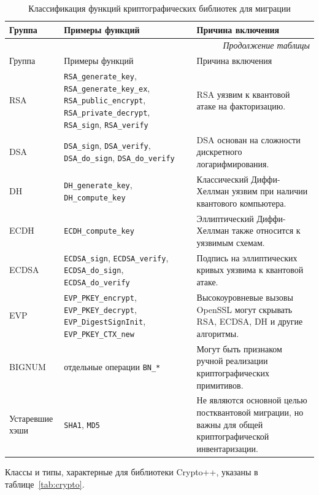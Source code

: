 \documentclass{itmo-vkr}
\begin{document}
\begin{longtable}{|l|p{5.0cm}|p{6.5cm}|}
	\caption{Классификация функций криптографических библиотек для миграции} \label{tab:openssl} \\
	\hline
	Группа & Примеры функций & Причина включения \\ \hline
	\endfirsthead
	
	\multicolumn{3}{r}{\textit{Продолжение таблицы \thetable}} \\ \hline
	Группа & Примеры функций & Причина включения \\ \hline
	\endhead
	\hline
	\endlastfoot
	
	RSA & \texttt{RSA\_generate\_key}, \texttt{RSA\_generate\_key\_ex}, \texttt{RSA\_public\_encrypt}, \texttt{RSA\_private\_decrypt}, \texttt{RSA\_sign}, \texttt{RSA\_verify} & RSA уязвим к квантовой атаке на факторизацию. \\ \hline
	DSA & \texttt{DSA\_sign}, \texttt{DSA\_verify}, \texttt{DSA\_do\_sign}, \texttt{DSA\_do\_verify} & DSA основан на сложности дискретного логарифмирования. \\ \hline
	DH & \texttt{DH\_generate\_key}, \texttt{DH\_compute\_key} & Классический Диффи-Хеллман уязвим при наличии квантового компьютера. \\ \hline
	ECDH & \texttt{ECDH\_compute\_key} & Эллиптический Диффи-Хеллман также относится к уязвимым схемам. \\ \hline
	ECDSA & \texttt{ECDSA\_sign}, \texttt{ECDSA\_verify}, \texttt{ECDSA\_do\_sign}, \texttt{ECDSA\_do\_verify} & Подпись на эллиптических кривых уязвима к квантовой атаке. \\ \hline
	EVP & \texttt{EVP\_PKEY\_encrypt}, \texttt{EVP\_PKEY\_decrypt}, \texttt{EVP\_DigestSignInit}, \texttt{EVP\_PKEY\_CTX\_new} & Высокоуровневые вызовы OpenSSL могут скрывать RSA, ECDSA, DH и другие алгоритмы. \\ \hline
	BIGNUM & отдельные операции \texttt{BN\_*} & Могут быть признаком ручной реализации криптографических примитивов. \\ \hline
	Устаревшие хэши & \texttt{SHA1}, \texttt{MD5} & Не являются основной целью постквантовой миграции, но важны для общей криптографической инвентаризации.
\end{longtable}


Классы и типы, характерные для библиотеки Crypto++, указаны в таблице~\ref{tab:crypto}.
\end{document}
